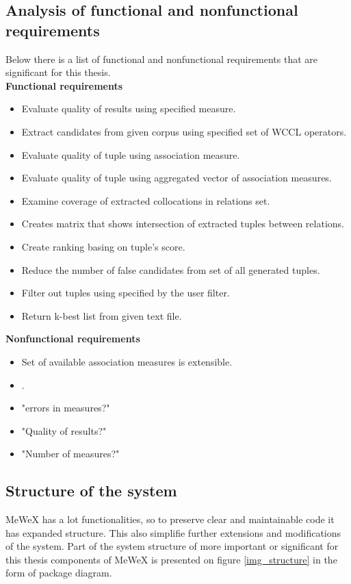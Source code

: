 \subsection{Analysis of functional and nonfunctional requirements}
Below there is a list of functional and nonfunctional requirements that are significant for this thesis.
\\\textbf{Functional requirements}
\begin{itemize}
    \setlength\itemsep{0em}
    \item Evaluate quality of results using specified measure.
    \item Extract candidates from given corpus using specified set of WCCL operators.
    \item Evaluate quality of tuple using association measure.
    \item Evaluate quality of tuple using aggregated vector of association measures.
    \item Examine coverage of extracted collocations in relations set.
    \item Creates matrix that shows intersection of extracted tuples between relations.
    \item Create ranking basing on tuple's score.
    \item Reduce the number of false candidates from set of all generated tuples.
    \item Filter out tuples using specified by the user filter.
    \item Return k-best list from given text file.
\end{itemize}
\textbf{Nonfunctional requirements}
\begin{itemize}
    \setlength\itemsep{0em}
    \item Set of available association measures is extensible.
    \item .
    \item "errors in measures?"
    \item "Quality of results?"
    \item "Number of measures?"
\end{itemize}

\subsection{Structure of the system}
MeWeX has a lot functionalities, so to preserve clear and maintainable code it has expanded structure. 
This also simplifie further extensions and modifications of the system. Part of the system structure of more important 
or significant for this thesis components of MeWeX is presented on figure \ref{img_structure} in the form of package diagram.

